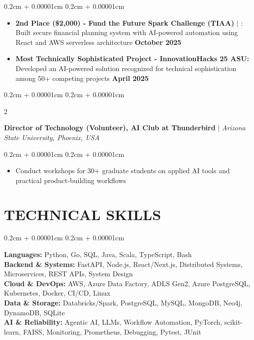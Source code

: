 \documentclass[9pt]{extarticle}
\newenvironment{highlights}{
    \begin{itemize}[
        topsep=0.02cm,
        parsep=0.02cm,
        partopsep=0pt,
        itemsep=0.01cm,
        leftmargin=0.4cm + 10pt
    ]
    \setlength{\itemsep}{0.01cm}
    \renewcommand{\labelitemi}{\textcolor{black}{$\bullet$}}
}{
    \end{itemize}
}
\newenvironment{onecolentry}{
    \begin{adjustwidth}{
        0.2cm + 0.00001cm
    }{
        0.2cm + 0.00001cm
    }
}{
    \end{adjustwidth}
}
\newenvironment{twocolentry}[2][]{
    \onecolentry
    \def\secondColumn{{\fontsize{8.5pt}{10pt}\selectfont #2}}
    \setcolumnwidth{\fill, 4cm}
    \begin{paracol}{2}
}{
    \switchcolumn \raggedleft \secondColumn
    \end{paracol}
    \endonecolentry
}
\let\hrefWithoutArrow\href
\renewcommand{\href}[2]{\hrefWithoutArrow{#1}{\ifthenelse{\equal{#2}{}}{ }{#2 }\raisebox{.15ex}{\footnotesize \faExternalLink*}}}
\begin{document}
    \begin{onecolentry}
        \begin{highlights}
            \item \textbf{2nd Place (\$2,000) - Fund the Future Spark Challenge (TIAA)} $|$ \href{https://www.linkedin.com/posts/asonti_tiaa-asu-fundthefuture-activity-7385160181057277952-9Y5S}{Post}: Built secure financial planning system with AI-powered automation using React and AWS serverless architecture \hfill {\fontsize{8.5pt}{10pt}\selectfont\textbf{October 2025}}
            \item \textbf{Most Technically Sophisticated Project - InnovationHacks 25 ASU:} Developed an AI-powered solution recognized for technical sophistication among 50+ competing projects \hfill {\fontsize{8.5pt}{10pt}\selectfont\textbf{April 2025}}
        \end{highlights}
    \end{onecolentry}

    \vspace{0.06cm}

    \begin{twocolentry}{
    \textbf{Nov 2025 - May 2026}}
        \textbf{Director of Technology (Volunteer), AI Club at Thunderbird} $|$ \textit{Arizona State University, Phoenix, USA}
    \end{twocolentry}

    \vspace{0.05cm}

    \begin{onecolentry}
        \begin{highlights}
            \item Conduct workshops for 30+ graduate students on applied AI tools and practical product-building workflows
        \end{highlights}
    \end{onecolentry}

    \section{TECHNICAL SKILLS}

    \begin{onecolentry}
        {\small
        \textbf{Languages:} Python, Go, SQL, Java, Scala, TypeScript, Bash \\
        \textbf{Backend \& Systems:} FastAPI, Node.js, React/Next.js, Distributed Systems, Microservices, REST APIs, System Design \\
        \textbf{Cloud \& DevOps:} AWS, Azure Data Factory, ADLS Gen2, Azure PostgreSQL, Kubernetes, Docker, CI/CD, Linux \\
        \textbf{Data \& Storage:} Databricks/Spark, PostgreSQL, MySQL, MongoDB, Neo4j, DynamoDB, SQLite \\
        \textbf{AI \& Reliability:} Agentic AI, LLMs, Workflow Automation, PyTorch, scikit-learn, FAISS, Monitoring, Prometheus, Debugging, Pytest, JUnit
        }
    \end{onecolentry}
\end{document}
